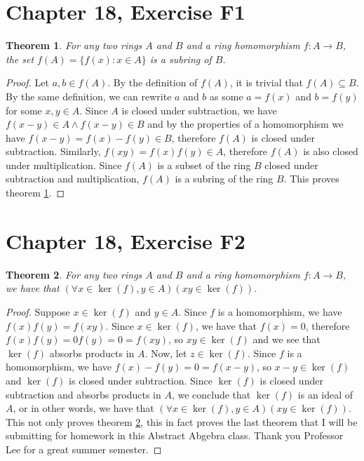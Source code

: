 \documentclass[12pt]{article}
\newtheorem{thm}{Theorem}
\begin{document}
\section{Chapter 18, Exercise F1}

\begin{thm} \label{thm9}
	For any two rings $A$ and $B$ and a ring homomorphism $f:A \to B$,
	the set $f(A) = \{f(x): x \in A \}$ is a subring of $B$.
\end{thm}

\begin{proof}
	Let $a,b \in f(A)$.
	By the definition of $f(A)$,
	it is trivial that $f(A) \subseteq B$.
	By the same definition, we can rewrite $a$ and $b$
	as some $a = f(x)$ and $b = f(y)$ for some $x,y \in A$.
	Since $A$ is closed under subtraction,
	we have $f(x - y) \in A \land f(x - y) \in B$
	and by the properties of a homomorphism
	we have $f(x -y) = f(x) - f(y) \in B$,
	therefore $f(A)$ is closed under subtraction.
	Similarly, $f(xy) = f(x)f(y) \in A$,
	therefore $f(A)$ is also closed under multiplication.
	Since $f(A)$ is a subset of the ring $B$
	closed under subtraction and multiplication,
	$f(A)$ is a subring of the ring $B$.
	This proves theorem \ref{thm9}.
\end{proof}

\section{Chapter 18, Exercise F2}


\begin{thm} \label{thm10}
	For any two rings $A$ and $B$ and a ring homomorphism $f:A \to B$,
	we have that $(\forall x \in \ker(f), y \in A)(xy \in \ker(f))$.
\end{thm}

\begin{proof}
	Suppose $x \in \ker(f)$ and $y \in A$.
	Since $f$ is a homomorphism,
	we have $f(x)f(y) = f(xy)$.
	Since $x \in \ker(f)$, we have that $f(x) = 0$,
	therefore $f(x)f(y) = 0f(y) = 0 = f(xy)$,
	so $xy \in \ker(f)$ and we see that $\ker(f)$
	absorbs products in $A$.
	Now, let $z \in \ker(f)$.
	Since $f$ is a homomorphism, we have $f(x) - f(y) = 0 = f(x - y)$,
	so $x - y \in \ker(f)$ and $\ker(f)$ is closed under subtraction.
	Since $\ker(f)$ is closed under subtraction and absorbs products in $A$,
	we conclude that $\ker(f)$ is an ideal of $A$,
	or in other words,
	we have that $(\forall x \in \ker(f), y \in A)(xy \in \ker(f))$.
	This not only proves theorem \ref{thm10},
	this in fact proves the last theorem that I will be submitting
	for homework in this Abstract Abgebra class.
	Thank you Professor Lee for a great summer semester.
\end{proof}
\end{document}
